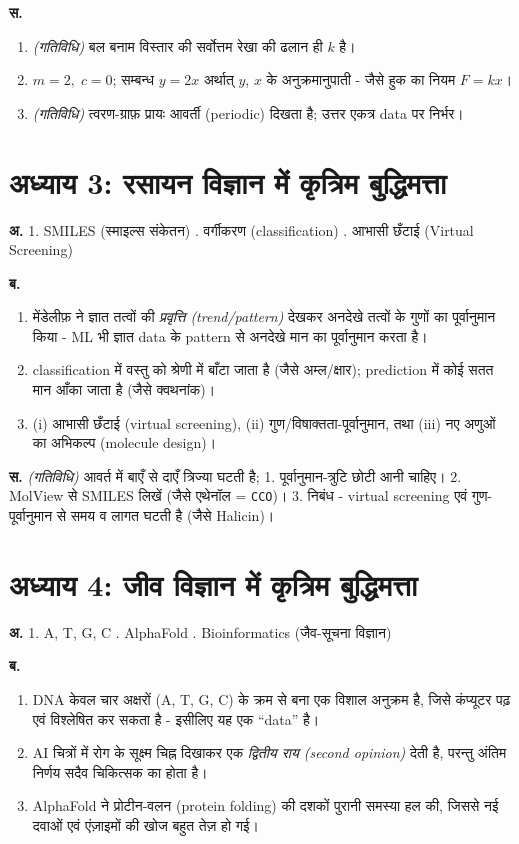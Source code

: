 \noindent\textbf{स.}
\begin{enumerate}[leftmargin=1.6em]
  \item \textit{(गतिविधि)} बल बनाम विस्तार की सर्वोत्तम रेखा की ढलान ही $k$ है।
  \item $m = 2,\; c = 0$; सम्बन्ध $y = 2x$ अर्थात् $y$, $x$ के अनुक्रमानुपाती - जैसे
        हुक का नियम $F = kx$।
  \item \textit{(गतिविधि)} त्वरण-ग्राफ़ प्रायः आवर्ती (periodic) दिखता है; उत्तर
        एकत्र data पर निर्भर।
\end{enumerate}

\section*{अध्याय 3: रसायन विज्ञान में कृत्रिम बुद्धिमत्ता}
\textbf{अ.} 1. SMILES (स्माइल्स संकेतन) . वर्गीकरण (classification) . आभासी छँटाई (Virtual Screening)

\noindent\textbf{ब.}
\begin{enumerate}[leftmargin=1.6em]
  \item मेंडेलीफ़ ने ज्ञात तत्वों की \emph{प्रवृत्ति (trend/pattern)} देखकर अनदेखे
        तत्वों के गुणों का पूर्वानुमान किया - ML भी ज्ञात data के pattern से अनदेखे मान
        का पूर्वानुमान करता है।
  \item classification में वस्तु को श्रेणी में बाँटा जाता है (जैसे अम्ल/क्षार);
        prediction में कोई सतत मान आँका जाता है (जैसे क्वथनांक)।
  \item (i) आभासी छँटाई (virtual screening), (ii) गुण/विषाक्तता-पूर्वानुमान, तथा
        (iii) नए अणुओं का अभिकल्प (molecule design)।
\end{enumerate}

\noindent\textbf{स.} \textit{(गतिविधि)} आवर्त में बाएँ से दाएँ त्रिज्या घटती है; 1.
पूर्वानुमान-त्रुटि छोटी आनी चाहिए। 2. MolView से SMILES लिखें (जैसे एथेनॉल = \texttt{CCO})।
3. निबंध - virtual screening एवं गुण-पूर्वानुमान से समय व लागत घटती है (जैसे Halicin)।

\section*{अध्याय 4: जीव विज्ञान में कृत्रिम बुद्धिमत्ता}
\textbf{अ.} 1. A, T, G, C . AlphaFold . Bioinformatics (जैव-सूचना विज्ञान)

\noindent\textbf{ब.}
\begin{enumerate}[leftmargin=1.6em]
  \item DNA केवल चार अक्षरों (A, T, G, C) के क्रम से बना एक विशाल अनुक्रम है, जिसे
        कंप्यूटर पढ़ एवं विश्लेषित कर सकता है - इसीलिए यह एक “data” है।
  \item AI चित्रों में रोग के सूक्ष्म चिह्न दिखाकर एक \emph{द्वितीय राय (second
        opinion)} देती है, परन्तु अंतिम निर्णय सदैव चिकित्सक का होता है।
  \item AlphaFold ने प्रोटीन-वलन (protein folding) की दशकों पुरानी समस्या हल की,
        जिससे नई दवाओं एवं एंज़ाइमों की खोज बहुत तेज़ हो गई।
\end{enumerate}

